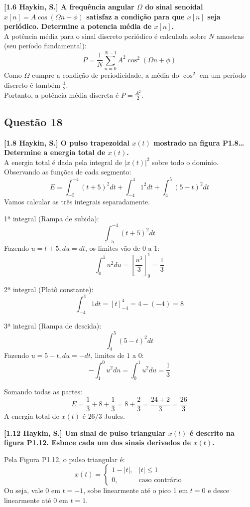 \textbf{{[}1.6 Haykin, S.{]} A frequência angular \(\Omega\) do sinal senoidal \(x[n] = A \cos(\Omega n + \phi)\) satisfaz a condição para que \(x[n]\) seja periódico. Determine a potencia média de \(x[n]\).}\\
A potência média para o sinal discreto periódico é calculada sobre \(N\) amostras (seu período fundamental):
\[P = \frac{1}{N} \sum_{n=0}^{N-1} A^2 \cos^2(\Omega n + \phi)\]
Como \(\Omega\) cumpre a condição de periodicidade, a média do \(\cos^2\) em um período discreto é também \(\frac{1}{2}\).\\
Portanto, a potência média discreta é \(P = \frac{A^2}{2}\).

\subsection{Questão 18}\label{questuxe3o-18}

\textbf{{[}1.8 Haykin, S.{]} O pulso trapezoidal \(x(t)\) mostrado na figura P1.8\ldots{} Determine a energia total de \(x(t)\).}\\
A energia total é dada pela integral de \(|x(t)|^2\) sobre todo o domínio. Observando as funções de cada segmento:
\[E = \int_{-5}^{-4} (t+5)^2 dt + \int_{-4}^{4} 1^2 dt + \int_{4}^{5} (5-t)^2 dt\]
Vamos calcular as três integrais separadamente.

1ª integral (Rampa de subida):
\[\int_{-5}^{-4} (t+5)^2 dt\]
Fazendo \(u = t+5, du = dt\), os limites vão de \(0\) a \(1\):
\[\int_{0}^{1} u^2 du = \left[ \frac{u^3}{3} \right]_0^1 = \frac{1}{3}\]

2ª integral (Platô constante):
\[\int_{-4}^{4} 1 dt = [t]_{-4}^4 = 4 - (-4) = 8\]

3ª integral (Rampa de descida):
\[\int_{4}^{5} (5-t)^2 dt\]
Fazendo \(u = 5-t, du = -dt\), limites de \(1\) a \(0\):
\[-\int_{1}^{0} u^2 du = \int_{0}^{1} u^2 du = \frac{1}{3}\]

Somando todas as partes:
\[E = \frac{1}{3} + 8 + \frac{1}{3} = 8 + \frac{2}{3} = \frac{24+2}{3} = \frac{26}{3}\]
A energia total de \(x(t)\) é \(26/3\) Joules.

\textbf{{[}1.12 Haykin, S.{]} Um sinal de pulso triangular \(x(t)\) é descrito na figura P1.12. Esboce cada um dos sinais derivados de \(x(t)\).}

Pela Figura P1.12, o pulso triangular é:
\[x(t) = \begin{cases} 1 - |t|, & |t| \le 1 \\ 0, & \text{caso contrário} \end{cases}\]
Ou seja, vale 0 em \(t = -1\), sobe linearmente até o pico 1 em \(t = 0\) e desce linearmente até 0 em \(t = 1\).

